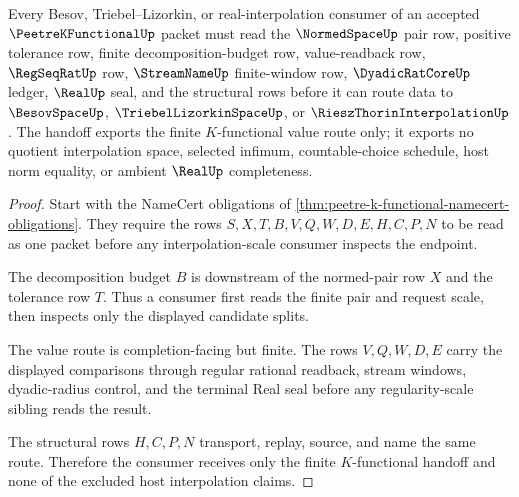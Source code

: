 \begin{theorem}
\label{thm:peetre-k-functional-interpolation-handoff}
Every Besov, Triebel--Lizorkin, or real-interpolation consumer of an accepted $\PeetreKFunctionalUp$ packet must read the $\NormedSpaceUp$ pair row, positive tolerance row, finite decomposition-budget row, value-readback row, $\RegSeqRatUp$ row, $\StreamNameUp$ finite-window row, $\DyadicRatCoreUp$ ledger, $\RealUp$ seal, and the structural rows before it can route data to $\BesovSpaceUp$, $\TriebelLizorkinSpaceUp$, or $\RieszThorinInterpolationUp$. The handoff exports the finite $K$-functional value route only; it exports no quotient interpolation space, selected infimum, countable-choice schedule, host norm equality, or ambient $\RealUp$ completeness.
\end{theorem}
\begin{proof}
Start with the NameCert obligations of \autoref{thm:peetre-k-functional-namecert-obligations}. They require the rows $S,X,T,B,V,Q,W,D,E,H,C,P,N$ to be read as one packet before any interpolation-scale consumer inspects the endpoint.

The decomposition budget $B$ is downstream of the normed-pair row $X$ and the tolerance row $T$. Thus a consumer first reads the finite pair and request scale, then inspects only the displayed candidate splits.

The value route is completion-facing but finite. The rows $V,Q,W,D,E$ carry the displayed comparisons through regular rational readback, stream windows, dyadic-radius control, and the terminal Real seal before any regularity-scale sibling reads the result.

The structural rows $H,C,P,N$ transport, replay, source, and name the same route. Therefore the consumer receives only the finite $K$-functional handoff and none of the excluded host interpolation claims.
\end{proof}

